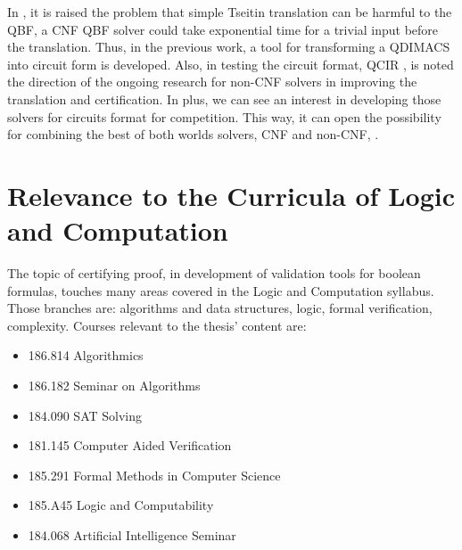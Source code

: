 \documentclass[12pt, a4paper]{article}
\begin{document}
In \cite{klieber_formal_nodate}, it is raised the problem that simple Tseitin translation can be harmful to the QBF, a CNF QBF solver could take exponential time for a trivial input before the translation. Thus, in the previous work, a tool for transforming a QDIMACS into circuit form is developed. Also, in \cite{jordan_non-cnf_nodate} testing the circuit format, QCIR \cite{noauthor_qcir-g14_nodate}, is noted the direction of the ongoing research for non-CNF solvers in improving the translation and certification. In plus, we can see an interest in developing those solvers for circuits format for competition. This way, it can open the possibility for combining the best of both worlds solvers, CNF and non-CNF, \cite{beyersdorff_circuit-based_2018}.

\newpage

\section{Relevance to the Curricula of Logic and Computation}

The topic of certifying proof, in development of validation tools for boolean formulas, touches many areas covered in the Logic and Computation syllabus. Those branches are: algorithms and data structures, logic, formal verification, complexity. Courses relevant to the thesis' content are:

\begin{itemize}
    \item 186.814 Algorithmics
    \item 186.182 Seminar on Algorithms
    \item 184.090 SAT Solving
    \item 181.145 Computer Aided Verification
    \item 185.291 Formal Methods in Computer Science
    \item 185.A45 Logic and Computability
    \item 184.068 Artificial Intelligence Seminar
\end{itemize}

\newpage



\end{document}
